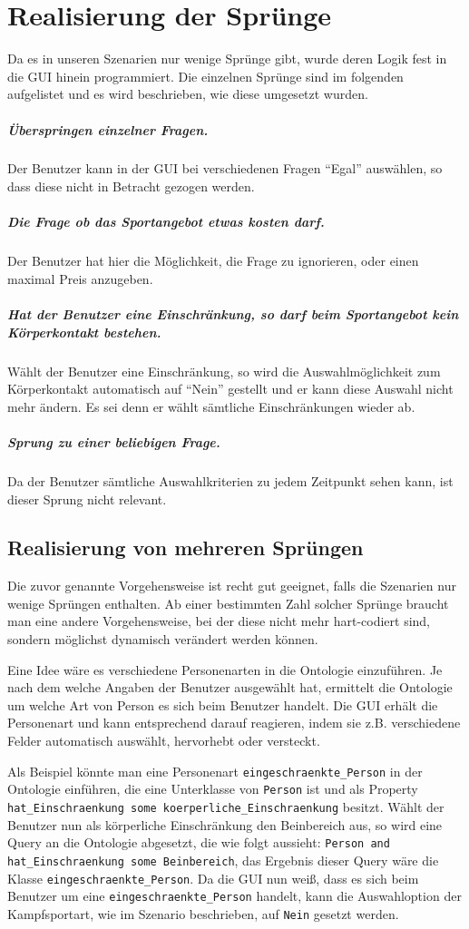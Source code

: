 \section{Realisierung der Sprünge}
Da es in unseren Szenarien nur wenige Sprünge gibt, wurde deren Logik fest in die GUI hinein programmiert. Die einzelnen Sprünge sind im folgenden aufgelistet und es wird beschrieben, wie diese umgesetzt wurden.

\subparagraph{Überspringen einzelner Fragen.} Der Benutzer kann in der GUI bei verschiedenen Fragen "`Egal"' auswählen, so dass diese nicht in Betracht gezogen werden. 
\subparagraph{Die Frage ob das Sportangebot etwas kosten darf.} Der Benutzer hat hier die Möglichkeit, die Frage zu ignorieren, oder einen maximal Preis anzugeben.
\subparagraph{Hat der Benutzer eine Einschränkung, so darf beim Sportangebot kein Körperkontakt bestehen.} Wählt der Benutzer eine Einschränkung, so wird die Auswahlmöglichkeit zum Körperkontakt automatisch auf "`Nein"' gestellt und er kann diese Auswahl nicht mehr ändern. Es sei denn er wählt sämtliche Einschränkungen wieder ab.
\subparagraph{Sprung zu einer beliebigen Frage.} Da der Benutzer sämtliche Auswahlkriterien zu jedem Zeitpunkt sehen kann, ist dieser Sprung nicht relevant.

\subsection{Realisierung von mehreren Sprüngen}
Die zuvor genannte Vorgehensweise ist recht gut geeignet, falls die Szenarien nur wenige Sprüngen enthalten. Ab einer bestimmten Zahl solcher Sprünge braucht man eine andere Vorgehensweise, bei der diese nicht mehr hart-codiert sind, sondern möglichst dynamisch verändert werden können.

Eine Idee wäre es verschiedene Personenarten in die Ontologie einzuführen. Je nach dem welche Angaben der Benutzer ausgewählt hat, ermittelt die Ontologie um welche Art von Person es sich beim Benutzer handelt. Die GUI erhält die Personenart und kann entsprechend darauf reagieren, indem sie z.B. verschiedene Felder automatisch auswählt, hervorhebt oder versteckt.

Als Beispiel könnte man eine Personenart \lstinline"eingeschraenkte_Person" in der Ontologie einführen, die eine Unterklasse von \lstinline"Person" ist und als Property \lstinline"hat_Einschraenkung some koerperliche_Einschraenkung" besitzt. Wählt der Benutzer nun als körperliche Einschränkung den Beinbereich aus, so wird eine Query an die Ontologie abgesetzt, die wie folgt aussieht: \lstinline"Person and hat_Einschraenkung some Beinbereich", das Ergebnis dieser Query wäre die Klasse \lstinline"eingeschraenkte_Person". Da die GUI nun weiß, dass es sich beim Benutzer um eine \lstinline"eingeschraenkte_Person" handelt, kann die Auswahloption der Kampfsportart, wie im Szenario beschrieben, auf \lstinline"Nein" gesetzt werden.

